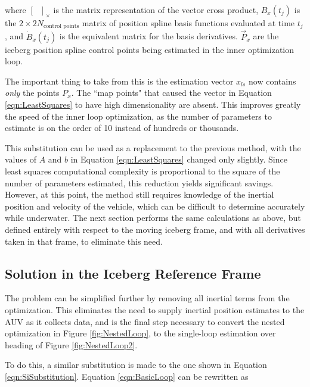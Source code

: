 where $[~~~]_\times$ is the matrix representation of the vector cross product, $B_x(t_j)$ is the $2\times2N_\text{control points}$ matrix of position spline basis functions evaluated at time $t_j$, and $\dot{B}_x(t_j)$ is the equivalent matrix for the basis derivatives. $\vec{P}_x$ are the iceberg position spline control points being estimated in the inner optimization loop.

The important thing to take from this is the estimation vector $x_{ls}$ now contains \emph{only} the points $P_x$. The ``map points" that caused the vector in Equation \ref{eqn:LeastSquares} to have high dimensionality are absent. This improves greatly the speed of the inner loop optimization, as the number of parameters to estimate is on the order of 10 instead of hundreds or thousands.

This substitution can be used as a replacement to the previous method, with the values of $A$ and $b$ in Equation \ref{eqn:LeastSquares} changed only slightly. Since least squares computational complexity is proportional to the square of the number of parameters estimated, this reduction yields significant savings. However, at this point, the method still requires knowledge of the inertial position and velocity of the vehicle, which can be difficult to determine accurately while underwater. The next section performs the same calculations as above, but defined entirely with respect to the moving iceberg frame, and with all derivatives taken in that frame, to eliminate this need. 


\subsection{Solution in the Iceberg Reference Frame}
\label{sec.MainContrib}
The problem can be simplified further by removing all inertial terms from the optimization. This eliminates the need to supply inertial position estimates to the AUV as it collects data, and is the final step necessary to convert the nested optimization in Figure \ref{fig:NestedLoop}, to the single-loop estimation over heading of Figure \ref{fig:NestedLoop2}. 

To do this, a similar substitution is made to the one shown in Equation \ref{eqn:SiSubstitution}. Equation \ref{eqn:BasicLoop} can be rewritten as

